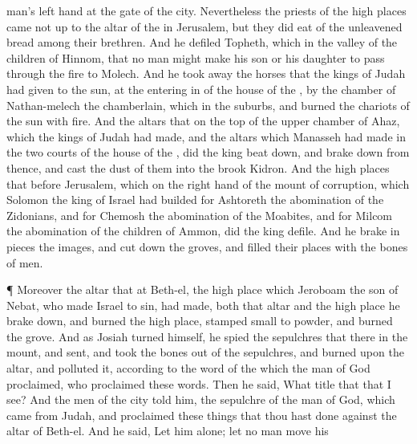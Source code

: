{man’s left
hand at the
gate of the
city.
Nevertheless the
priests of the high
places came not
up to the
altar of the
{} in
Jerusalem, but they did
eat of the unleavened
bread
among their
brethren.
And he
defiled
Topheth, which
{} in the
valley of the
children of
Hinnom, that no
man might make his
son or his
daughter to pass
through the
fire to
Molech.
And he took
away the
horses that the
kings of
Judah had
given to the
sun, at the entering
in of the
house of the
{}, by the
chamber of
Nathan-melech the
chamberlain, which
{} in the
suburbs, and
burned the
chariots of the
sun with
fire.
And the
altars that
{} on the
top of the upper
chamber of
Ahaz, which the
kings of
Judah had
made, and the
altars which
Manasseh had
made in the
two
courts of the
house of the
{}, did the
king beat
down, and brake
{}
down from thence, and
cast the
dust of them into the
brook
Kidron.
And the high
places that
{}
before
Jerusalem, which
{} on the right
hand of the
mount of
corruption, which
Solomon the
king of
Israel had
builded for
Ashtoreth the
abomination of the
Zidonians, and for
Chemosh the
abomination of the
Moabites, and for
Milcom the
abomination of the
children of
Ammon, did the
king
defile.
And he brake in
pieces the
images, and cut
down the
groves, and
filled their
places with the
bones of
men.
\par }{\PP {}¶ Moreover the
altar that
{} at
Beth-el,
{} the high
place which
Jeroboam the
son of
Nebat, who made
Israel to
sin, had
made, both that
altar and the high
place he brake
down, and
burned the high
place,
{}
stamped
{} small to
powder, and
burned the
grove.
And as
Josiah
turned himself, he
spied the
sepulchres that
{} there in the
mount, and
sent, and
took the
bones out of the
sepulchres, and
burned
{} upon the
altar, and
polluted it, according to the
word of the
{} which the
man of
God
proclaimed, who
proclaimed these
words.
Then he
said, What
title
{}
that that I
see? And the
men of the
city
told him,
{} the
sepulchre of the
man of
God, which
came from
Judah, and
proclaimed these
things that thou hast
done against the
altar of
Beth-el.
And he
said, Let him
alone; let no
man
move his
}
